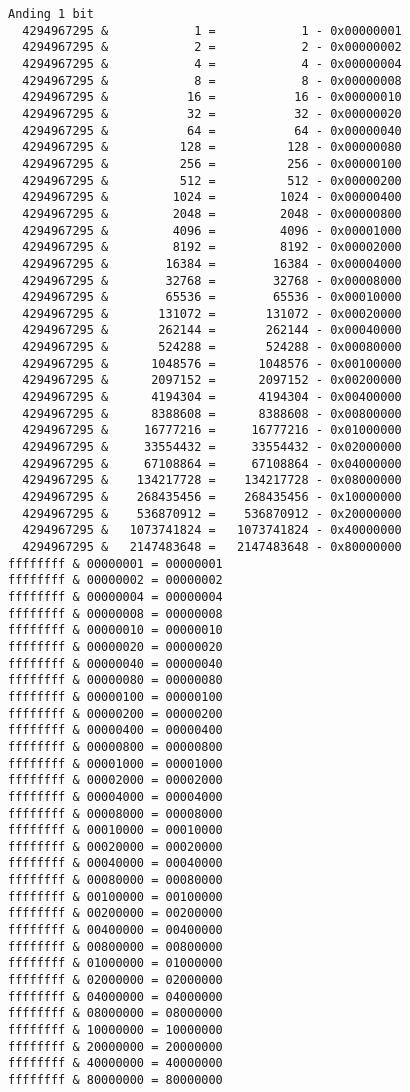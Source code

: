 \documentclass[11pt]{article}
\begin{document}
\begin{verbatim}
Anding 1 bit
  4294967295 &            1 =            1 - 0x00000001
  4294967295 &            2 =            2 - 0x00000002
  4294967295 &            4 =            4 - 0x00000004
  4294967295 &            8 =            8 - 0x00000008
  4294967295 &           16 =           16 - 0x00000010
  4294967295 &           32 =           32 - 0x00000020
  4294967295 &           64 =           64 - 0x00000040
  4294967295 &          128 =          128 - 0x00000080
  4294967295 &          256 =          256 - 0x00000100
  4294967295 &          512 =          512 - 0x00000200
  4294967295 &         1024 =         1024 - 0x00000400
  4294967295 &         2048 =         2048 - 0x00000800
  4294967295 &         4096 =         4096 - 0x00001000
  4294967295 &         8192 =         8192 - 0x00002000
  4294967295 &        16384 =        16384 - 0x00004000
  4294967295 &        32768 =        32768 - 0x00008000
  4294967295 &        65536 =        65536 - 0x00010000
  4294967295 &       131072 =       131072 - 0x00020000
  4294967295 &       262144 =       262144 - 0x00040000
  4294967295 &       524288 =       524288 - 0x00080000
  4294967295 &      1048576 =      1048576 - 0x00100000
  4294967295 &      2097152 =      2097152 - 0x00200000
  4294967295 &      4194304 =      4194304 - 0x00400000
  4294967295 &      8388608 =      8388608 - 0x00800000
  4294967295 &     16777216 =     16777216 - 0x01000000
  4294967295 &     33554432 =     33554432 - 0x02000000
  4294967295 &     67108864 =     67108864 - 0x04000000
  4294967295 &    134217728 =    134217728 - 0x08000000
  4294967295 &    268435456 =    268435456 - 0x10000000
  4294967295 &    536870912 =    536870912 - 0x20000000
  4294967295 &   1073741824 =   1073741824 - 0x40000000
  4294967295 &   2147483648 =   2147483648 - 0x80000000
ffffffff & 00000001 = 00000001
ffffffff & 00000002 = 00000002
ffffffff & 00000004 = 00000004
ffffffff & 00000008 = 00000008
ffffffff & 00000010 = 00000010
ffffffff & 00000020 = 00000020
ffffffff & 00000040 = 00000040
ffffffff & 00000080 = 00000080
ffffffff & 00000100 = 00000100
ffffffff & 00000200 = 00000200
ffffffff & 00000400 = 00000400
ffffffff & 00000800 = 00000800
ffffffff & 00001000 = 00001000
ffffffff & 00002000 = 00002000
ffffffff & 00004000 = 00004000
ffffffff & 00008000 = 00008000
ffffffff & 00010000 = 00010000
ffffffff & 00020000 = 00020000
ffffffff & 00040000 = 00040000
ffffffff & 00080000 = 00080000
ffffffff & 00100000 = 00100000
ffffffff & 00200000 = 00200000
ffffffff & 00400000 = 00400000
ffffffff & 00800000 = 00800000
ffffffff & 01000000 = 01000000
ffffffff & 02000000 = 02000000
ffffffff & 04000000 = 04000000
ffffffff & 08000000 = 08000000
ffffffff & 10000000 = 10000000
ffffffff & 20000000 = 20000000
ffffffff & 40000000 = 40000000
ffffffff & 80000000 = 80000000
\end{verbatim}
\end{document}

